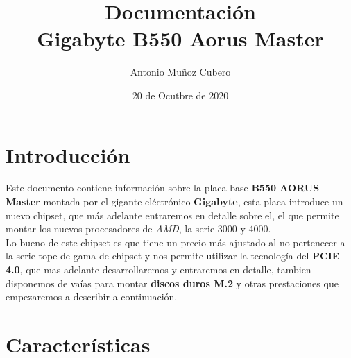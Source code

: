 \documentclass{article}
\title{Documentación \\\large \textbf{Gigabyte B550 Aorus Master}}
\author{Antonio Muñoz Cubero}
\date{20 de Ocutbre de 2020}
\begin{document}
\maketitle
{}
\pagestyle{fancy} 

\newpage
\tableofcontents
{}


\section{Introducción}
Este documento contiene información sobre la placa base \textbf{B550 AORUS Master} montada por el gigante eléctrónico \textbf{Gigabyte}, esta placa introduce un nuevo chipset, que más adelante entraremos en detalle sobre el, 
el  
que permite montar los nuevos procesadores de \textit{AMD}, la serie 3000 y 4000.\\
Lo bueno de este chipset es que tiene un precio más ajustado al no pertenecer a la serie tope de gama de chipset y nos permite utilizar la tecnología del \textbf{PCIE 4.0}, que mas adelante desarrollaremos y entraremos en 
detalle, tambien 
disponemos de vaías para montar \textbf{discos duros M.2} y otras prestaciones que empezaremos a describir a continuación.

\newpage
\section{Características}
\end{document}

